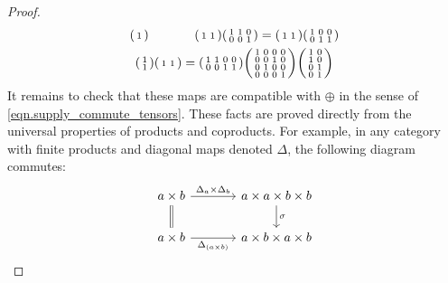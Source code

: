\documentclass[11pt, oneside, article]{memoir}
\theoremstyle{plain}
\theoremstyle{definition}
\theoremstyle{remark}
\begin{document}
\begin{proof}
\begin{gather*}
\begin{psmallmatrix}
  1
\end{psmallmatrix}
\hspace{.5in}
\begin{psmallmatrix}
  1&1
\end{psmallmatrix}
\begin{psmallmatrix}
  1&1&0\\
  0&0&1
\end{psmallmatrix}
=
\begin{psmallmatrix}
  1&1
\end{psmallmatrix}
\begin{psmallmatrix}
  1&0&0\\
  0&1&1
\end{psmallmatrix}
\\
\begin{psmallmatrix}
  1\\
  1
\end{psmallmatrix}
\begin{psmallmatrix}
  1&1
\end{psmallmatrix}
=
\begin{psmallmatrix}
  1&1&0&0\\
  0&0&1&1
\end{psmallmatrix}
\begin{psmallmatrix}
  1&0&0&0\\
  0&0&1&0\\
  0&1&0&0\\
  0&0&0&1
\end{psmallmatrix}
\begin{psmallmatrix}
  1&0\\
  1&0\\
  0&1\\
  0&1
\end{psmallmatrix}
\end{gather*}
It remains to check that these maps are compatible with $\oplus$ in the sense of \cref{eqn.supply_commute_tensors}. These facts are proved directly from the universal properties of products and coproducts. For example, in any category with finite products and diagonal maps denoted $\Delta$, the following diagram commutes:
\[
\begin{tikzcd}[column sep=large]
	a\times b\ar[r, "\Delta_a\times\Delta_b"]\ar[d, equal]&
	a\times a\times b\times b\ar[d, "\sigma"]\\
	a\times b\ar[r, "\Delta_{(a\times b)}"']&
	a\times b\times a\times b
\end{tikzcd}
\qedhere
\]
\end{proof}
\end{document}
